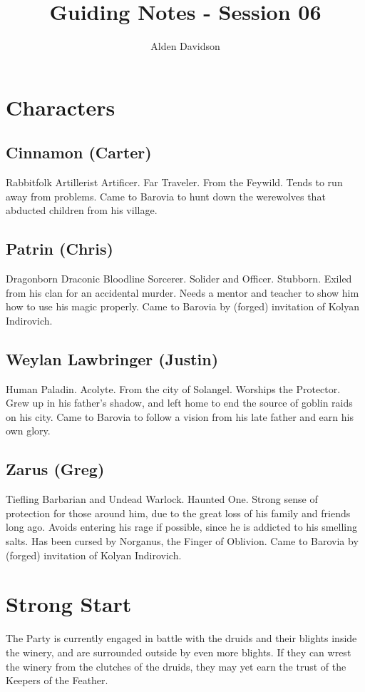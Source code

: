 \documentclass[a4paper,11pt]{article}
\title{Guiding Notes - Session 06}
\author{Alden Davidson}
\begin{document}
\maketitle
\tableofcontents

\pagebreak
\section{Characters}
\label{sec:Characters}
\subsection{Cinnamon (Carter)}
  Rabbitfolk Artillerist Artificer. Far Traveler. From the Feywild. Tends to run away from problems. Came to
  Barovia to hunt down the werewolves that abducted children from his village.
\subsection{Patrin (Chris)}
  Dragonborn Draconic Bloodline Sorcerer. Solider and Officer. Stubborn. Exiled from his clan for an accidental 
  murder. Needs a mentor and teacher to show him how to use his magic properly. Came to Barovia by (forged)
  invitation of Kolyan Indirovich.
\subsection{Weylan Lawbringer (Justin)}
  Human Paladin. Acolyte. From the city of Solangel. Worships the Protector. Grew up in his father's shadow, and 
  left home to end the source of goblin raids on his city. Came to Barovia to follow a vision from his late 
  father and earn his own glory.
\subsection{Zarus (Greg)}
  Tiefling Barbarian and Undead Warlock. Haunted One. Strong sense of protection for those around him, due to the
  great loss of his family and friends long ago. Avoids entering his rage if possible, since he is addicted to 
  his smelling salts. Has been cursed by Norganus, the Finger of Oblivion. Came to Barovia by (forged) 
  invitation of Kolyan Indirovich.


\pagebreak
\section{Strong Start}
\label{sec:StrongStart}
The Party is currently engaged in battle with the druids and their blights inside the winery, and are surrounded 
outside by even more blights. If they can wrest the winery from the clutches of the druids, they may yet earn the
trust of the Keepers of the Feather.
\end{document}
